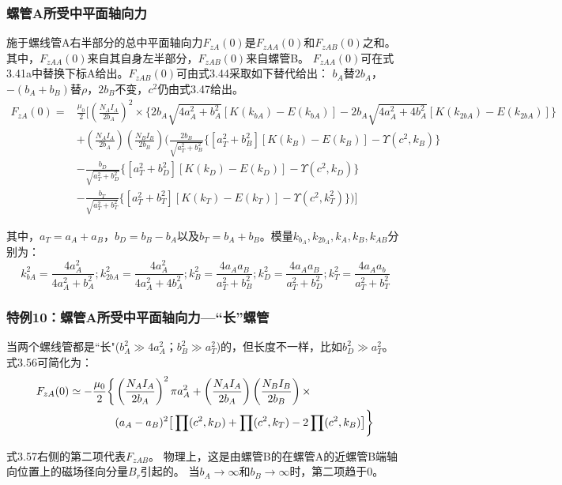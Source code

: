 \subsubsection{螺管A所受中平面轴向力}

施于螺线管A右半部分的总中平面轴向力$F_{zA}(0)$是$F_{zAA}(0)$和$F_{zAB}(0)$之和。
其中，$F_{zAA}(0)$来自其自身左半部分，$F_{zAB}(0)$来自螺管B。
$F_{zAA}(0)$可在式3.41a中替换下标A给出。$F_{zAB}(0)$可由式3.44采取如下替代给出：
$b_A$替$2b_A$，$−(b_A+b_B)$替$\rho$，$2b_B$不变，$c^2$仍由式3.47给出。
\begin{equation}
\begin{split}
F_{zA}(0)=&\frac{\mu_0}{2}\bigg[\left(\frac{N_A I_A}{2b_A}\right)^2\times \{2b_A\sqrt{4a_A^2+b_A^2}[K(k_{bA})-E(k_{bA})]-2b_A\sqrt{4a_A^2+4b_A^2}[K(k_{2bA})-E(k_{2bA})]\}\\
&+\left(\frac{N_AI_A}{2b_A}\right)\left(\frac{N_BI_B}{2b_B}\right)\bigg(\frac{2b_B}{\sqrt{a_T^2+b_B^2}}\{[a_T^2+b_B^2][K(k_B)-E(k_{B})]-\Upsilon(c^2,k_B)\}\\
&-\frac{b_D}{\sqrt{a_T^2+b_D^2}}\{{[a_T^2+b_D^2][K(k_D)-E(k_D)]-\Upsilon(c^2,k_D)}\}\\
&-\frac{b_T}{\sqrt{a_T^2+b_T^2}}\{[a_T^2+b_T^2][K(k_T)-E(k_T)]-\Upsilon(c^2,k_T^2)\}\bigg)\bigg]
\end{split}
\end{equation}

其中，$a_T=a_A+a_B$，$b_D=b_B-b_A$以及$b_T=b_A+b_B$。模量$k_{b_A}, k_{2b_A}, k_A,k_B, k_{AB}$分别为：
$$ k_{bA}^2=\frac{4a_A^2}{4a_A^2+b_A^2}; k_{2bA}^2=\frac{4a_A^2}{4a_A^2+4b_A^2}; k_B^2=\frac{4a_Aa_B}{a_T^2+b_B^2};k_D^2=\frac{4a_Aa_B}{a_T^2+b_D^2}; k_T^2=\frac{4a_Aa_b}{a_T^2+b_T^2}$$


\subsubsection{特例10：螺管A所受中平面轴向力---``长''螺管}
当两个螺线管都是``长"($b_A^2\gg 4a_A^2；b_B^2\gg a_T^2$)的，但长度不一样，比如$b_D^2\gg a_T^2$。
式3.56可简化为：
\begin{align}
F_{zA}(0)\simeq -\frac{\mu_0}{2}\bigg\{&\left(\frac{N_AI_A}{2b_A}\right)^2\pi a_A^2+\left(\frac{N_AI_A}{2b_A}\right)\left(\frac{N_BI_B}{2b_{B}}\right)\times\\\notag
&(a_A-a_B)^2\big[\prod(c^2,k_D)+\prod(c^2,k_T)-2\prod(c^2,k_B)\big]\bigg\}
\end{align}

式3.57右侧的第二项代表$F_{zAB}$。
物理上，这是由螺管B的在螺管A的近螺管B端轴向位置上的磁场径向分量$B_r$引起的。
当$b_A\rightarrow \infty$和$b_B\rightarrow \infty$时，第二项趋于0。

